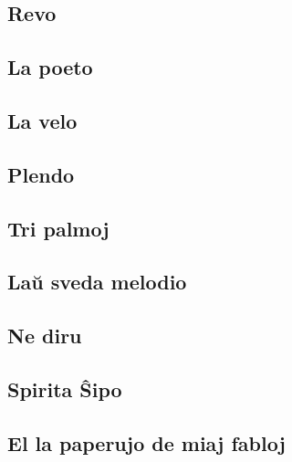 \documentclass[a5paper,11pt,openany,twoside]{book}
\begin{document}
\subsection{Revo}
\label{revo}


\subsection{La poeto}
\label{poeto}


\subsection{La velo}
\label{velo}


\subsection{Plendo}
\label{plendo}


\vspace*{-5ex} %

\subsection{Tri palmoj}
\label{palmoj}


\subsection{La\u u sveda melodio}
\label{sveda}


\subsection{Ne diru}
\label{nediru}


\subsection{Spirita \^Sipo}
\label{spirita}


\subsection{El la paperujo de miaj fabloj}
\label{paperujo}

\end{document}
